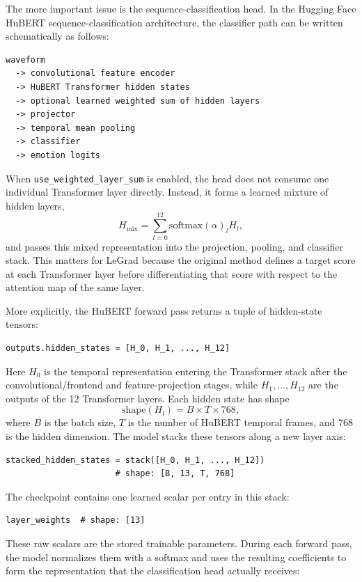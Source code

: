 \documentclass[11pt]{article}
\begin{document}
The more important issue is the sequence-classification head. In the Hugging
Face HuBERT sequence-classification architecture, the classifier path can be
written schematically as follows:

\begin{verbatim}
waveform
  -> convolutional feature encoder
  -> HuBERT Transformer hidden states
  -> optional learned weighted sum of hidden layers
  -> projector
  -> temporal mean pooling
  -> classifier
  -> emotion logits
\end{verbatim}

When \texttt{use\_weighted\_layer\_sum} is enabled, the head does not consume
one individual Transformer layer directly. Instead, it forms a learned mixture
of hidden layers,
\[
H_{\mathrm{mix}} = \sum_{l=0}^{12} \mathrm{softmax}(\alpha)_l H_l,
\]
and passes this mixed representation into the projection, pooling, and classifier stack. This
matters for LeGrad because the original method defines a target score at each
Transformer layer before differentiating that score with respect to the
attention map of the same layer.

More explicitly, the HuBERT forward pass returns a tuple of hidden-state
tensors:

\begin{verbatim}
outputs.hidden_states = [H_0, H_1, ..., H_12]
\end{verbatim}

Here $H_0$ is the temporal representation entering the Transformer stack after
the convolutional/frontend and feature-projection stages, while
$H_1,\ldots,H_{12}$ are the outputs of the 12 Transformer layers. Each hidden
state has shape
\[
\mathrm{shape}(H_l) = B \times T \times 768,
\]
where $B$ is the batch size, $T$ is the number of HuBERT temporal frames, and
768 is the hidden dimension. The model stacks these tensors along a new layer
axis:

\begin{verbatim}
stacked_hidden_states = stack([H_0, H_1, ..., H_12])
                      # shape: [B, 13, T, 768]
\end{verbatim}

The checkpoint contains one learned scalar per entry in this stack:
\begin{verbatim}
layer_weights  # shape: [13]
\end{verbatim}

These raw scalars are the stored trainable parameters. During each forward pass,
the model normalizes them with a softmax and uses the resulting coefficients to
form the representation that the classification head actually receives:
\end{document}
